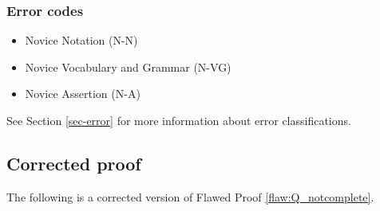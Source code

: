 \subsubsection{Error codes}
\begin{itemize}
    \item Novice Notation (N-N)
    \item Novice Vocabulary and Grammar (N-VG)
    \item Novice Assertion (N-A)
\end{itemize}
See Section \ref{sec-error} for more information about error classifications.

\clearpage
\subsection{Corrected proof}

The following is a corrected version of Flawed Proof \ref{flaw:Q_notcomplete}. %

